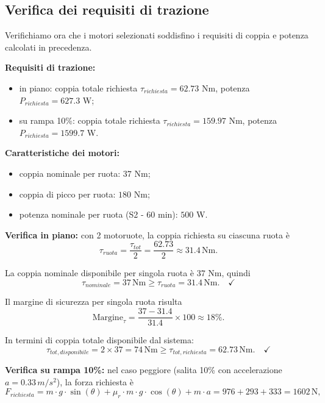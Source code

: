 \subsection{Verifica dei requisiti di trazione}
Verifichiamo ora che i motori selezionati soddisfino i requisiti di coppia e potenza calcolati in precedenza.

\textbf{Requisiti di trazione:}
\begin{itemize}
    \item in piano: coppia totale richiesta $\tau_{richiesta} = 62.73$ Nm, potenza $P_{richiesta} = 627.3$ W;
    \item su rampa 10\%: coppia totale richiesta $\tau_{richiesta} = 159.97$ Nm, potenza $P_{richiesta} = 1599.7$ W.
\end{itemize}

\textbf{Caratteristiche dei motori:}
\begin{itemize}
    \item coppia nominale per ruota: $37$ Nm;
    \item coppia di picco per ruota: $180$ Nm;
    \item potenza nominale per ruota (S2 - 60 min): $500$ W.
\end{itemize}

\textbf{Verifica in piano:}
con 2 motoruote, la coppia richiesta su ciascuna ruota è
\begin{equation}
    \tau_{ruota} = \frac{\tau_{tot}}{2} = \frac{62.73}{2} \approx 31.4 \, \text{Nm}.
\end{equation}

La coppia nominale disponibile per singola ruota è $37$ Nm, quindi
\begin{equation}
    \tau_{nominale} = 37 \, \text{Nm} \geq \tau_{ruota} = 31.4 \, \text{Nm}. \quad \checkmark
\end{equation}

Il margine di sicurezza per singola ruota risulta
\begin{equation}
    \text{Margine}_{\tau} = \frac{37 - 31.4}{31.4} \times 100 \approx 18\%.
\end{equation}

In termini di coppia totale disponibile dal sistema:
\begin{equation}
    \tau_{tot,disponibile} = 2 \times 37 = 74 \, \text{Nm} \geq \tau_{tot,richiesta} = 62.73 \, \text{Nm}. \quad \checkmark
\end{equation}

\textbf{Verifica su rampa 10\%:}
nel caso peggiore (salita 10\% con accelerazione $a = 0.33 \, m/s^2$), la forza richiesta è
\begin{equation}
    F_{richiesta} = m \cdot g \cdot \sin(\theta) + \mu_r \cdot m \cdot g \cdot \cos(\theta) + m \cdot a = 976 + 293 + 333 = 1602 \, \text{N},
\end{equation}

